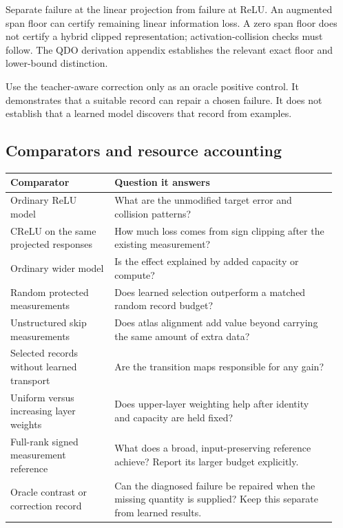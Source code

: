 Separate failure at the linear projection from failure at ReLU. An augmented
span floor can certify remaining linear information loss. A zero span floor
does not certify a hybrid clipped representation; activation-collision
checks must follow. The QDO derivation appendix establishes the relevant
exact floor and lower-bound distinction.

Use the teacher-aware correction only as an oracle positive control. It
demonstrates that a suitable record can repair a chosen failure. It does
not establish that a learned model discovers that record from examples.

\subsection{Comparators and resource accounting}

\begin{longtable}{@{}>{\raggedright\arraybackslash}p{0.30\linewidth}>{\raggedright\arraybackslash}p{0.64\linewidth}@{}}
\toprule
Comparator & Question it answers\\
\midrule
\endhead
Ordinary ReLU model & What are the unmodified target error and
collision patterns?\\
CReLU on the same projected responses & How much loss comes from
sign clipping after the existing measurement?\\
Ordinary wider model & Is the effect explained by added capacity or compute?\\
Random protected measurements & Does learned selection outperform a matched
random record budget?\\
Unstructured skip measurements & Does atlas alignment add value beyond
carrying the same amount of extra data?\\
Selected records without learned transport & Are the transition maps
responsible for any gain?\\
Uniform versus increasing layer weights & Does upper-layer weighting help
after identity and capacity are held fixed?\\
Full-rank signed measurement reference & What does a broad,
input-preserving reference achieve? Report its larger budget explicitly.\\
Oracle contrast or correction record & Can the diagnosed failure be repaired
when the missing quantity is supplied? Keep this separate from learned results.\\
\bottomrule
\end{longtable}

